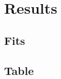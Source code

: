 \documentclass[9pt]{beamer}
\begin{document}
		\section{Results}
			\subsection{Fits}
				
				
				
				
				
				
				
				
				
				
				
				
			\subsection{Table}
				

\end{document}
